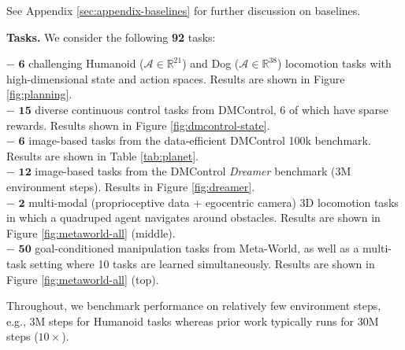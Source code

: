 \documentclass{article}
\begin{document}


See Appendix \ref{sec:appendix-baselines} for further discussion on baselines.

\textbf{Tasks.} We consider the following \textbf{92} tasks:

$\boldsymbol{-}$ $\mathbf{6}$ challenging Humanoid ($\mathcal{A} \in \mathbb{R}^{21}$) and Dog ($\mathcal{A} \in \mathbb{R}^{38}$) locomotion tasks with high-dimensional state and action spaces. Results are shown in Figure \ref{fig:planning}.\vspace{0.05in}\\
$\boldsymbol{-}$ $\mathbf{15}$ diverse continuous control tasks from DMControl, 6 of which have sparse rewards. Results shown in Figure \ref{fig:dmcontrol-state}.\vspace{0.05in}\\
$\boldsymbol{-}$ $\mathbf{6}$ image-based tasks from the data-efficient DMControl 100k benchmark. Results are shown in Table \ref{tab:planet}.\vspace{0.05in}\\
$\boldsymbol{-}$ $\mathbf{12}$ image-based tasks from the DMControl \textit{Dreamer} benchmark (3M environment steps). Results in Figure \ref{fig:dreamer}.\vspace{0.05in}\\
$\boldsymbol{-}$ $\mathbf{2}$ multi-modal (proprioceptive data + egocentric camera) 3D locomotion tasks in which a quadruped agent navigates around obstacles. Results are shown in Figure \ref{fig:metaworld-all} (middle).\vspace{0.05in}\\
$\boldsymbol{-}$ $\mathbf{50}$ goal-conditioned manipulation tasks from Meta-World, as well as a multi-task setting where 10 tasks are learned simultaneously. Results are shown in Figure \ref{fig:metaworld-all} (top).

Throughout, we benchmark performance on relatively few environment steps, e.g., 3M steps for Humanoid tasks whereas prior work typically runs for 30M steps ($10\times$).
\end{document}
